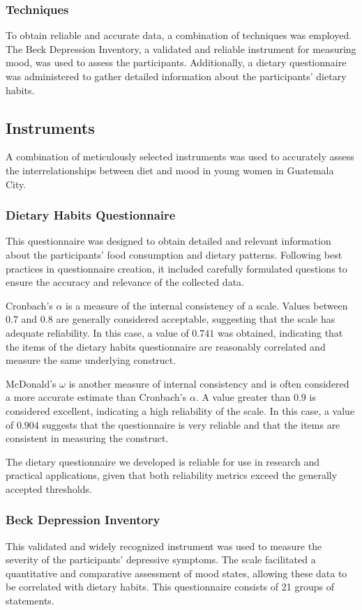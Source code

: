 \documentclass[jou]{apa7}
\begin{document}
\subsubsection{Techniques}
To obtain reliable and accurate data, a combination of techniques was employed. The Beck Depression Inventory, a validated and reliable instrument for measuring mood, was used to assess the participants. Additionally, a dietary questionnaire was administered to gather detailed information about the participants' dietary habits.


\subsection{Instruments}\label{instrumentos}

A combination of meticulously selected instruments was used to accurately assess the interrelationships between diet and mood in young women in Guatemala City.

\subsubsection{Dietary Habits Questionnaire} This questionnaire was designed to obtain detailed and relevant information about the participants' food consumption and dietary patterns. Following best practices in questionnaire creation, it included carefully formulated questions to ensure the accuracy and relevance of the collected data.

Cronbach's $\alpha$ is a measure of the internal consistency of a scale. Values between $0.7$ and $0.8$ are generally considered acceptable, suggesting that the scale has adequate reliability. In this case, a value of $0.741$ was obtained, indicating that the items of the dietary habits questionnaire are reasonably correlated and measure the same underlying construct.

McDonald's $\omega$ is another measure of internal consistency and is often considered a more accurate estimate than Cronbach's $\alpha$. A value greater than $0.9$ is considered excellent, indicating a high reliability of the scale. In this case, a value of $0.904$ suggests that the questionnaire is very reliable and that the items are consistent in measuring the construct.

The dietary questionnaire we developed is reliable for use in research and practical applications, given that both reliability metrics exceed the generally accepted thresholds.


\subsubsection{Beck Depression Inventory} This validated and widely recognized instrument was used to measure the severity of the participants' depressive symptoms. The scale facilitated a quantitative and comparative assessment of mood states, allowing these data to be correlated with dietary habits. This questionnaire consists of 21 groups of statements.
\end{document}
